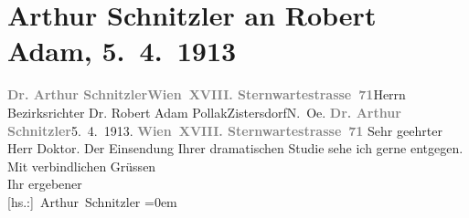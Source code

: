 

         
         \newcommand{\erwaehntePersonen}{Personen: Robert Adam}
         \newcommand{\erwaehnteOrte}{Orte: Niederösterreich, Sternwartestraße, Wien, XVIII., Währing, Zistersdorf}
         \newcommand{\erwaehnteWerke}{Werke: Fatme}
               \section[Arthur Schnitzler an Robert Adam, 5. 4. 1913]{ Arthur Schnitzler an Robert Adam, 5. 4. 1913}\nopagebreak{}\rehead{ }\begin{ledgroupsized}[t]{13cm}\normalsize\beginnumbering \toendnotes[C]{\smallbreak\pagebreak[2]} 
\toendnotes[C]{\smallbreak}\pstart{}{\pb}\textcolor{gray}{\textbf{Dr. Arthur Schnitzler}}\pend{}\pstart{}\textcolor{gray}{\textbf{Wien XVIII. Sternwartestrasse 71}}\pend{}{\bigskip}\pstart{}{\pb}Herrn Bezirksrichter Dr. Robert Adam
                        Pollak\pend{}\pstart{}Zistersdorf\pend{}\pstart{}N. Oe.\pend{}{\bigskip}\pstart
           \noindent{}{\pb}\textcolor{gray}{\textbf{Dr. Arthur Schnitzler}}\hfill 5. 4. 1913.\pend
           \pstart
           \textcolor{gray}{\textbf{Wien XVIII. Sternwartestrasse 71}}\pend
           \pstart\center{}Sehr geehrter Herr Doktor.\pend\pstart
           Der Einsendung Ihrer dramatischen
                        Studie sehe ich gerne entgegen.\pend
           \pstart
           Mit verbindlichen Grüssen{\\[\baselineskip]}Ihr ergebener{\\[\baselineskip]}\spacefill\mbox{{[}hs.:{]} Arthur Schnitzler}\pend
           \leftskip=0em{}
         
         \endnumbering{}\end{ledgroupsized}  \newcommand{\dateiname}{L02118}\newcommand{\titel}{Arthur Schnitzler an Robert Adam, 5. 4. 1913}\newcommand{\editorInnen}{Martin Anton Müller und Gerd-Hermann Susen}
      